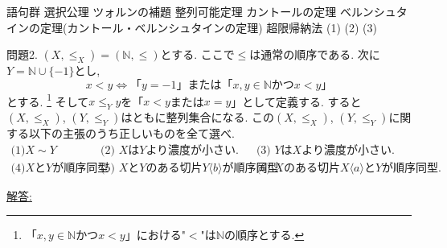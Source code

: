 \documentclass[dvipdfmx,a4paper,11pt]{article}
\newcommand{\N}{\mathbb{N}}
\theoremstyle{definition}
\begin{document}
 \begin{itembox}[l]{語句群}
選択公理 \quad ツォルンの補題 \quad 整列可能定理 \quad カントールの定理 \quad ベルンシュタインの定理(カントール・ベルンシュタインの定理)  \quad 超限帰納法 \quad (1)
\quad (2) \quad (3)
\end{itembox}
\newpage


 問題2. $(X, \le_X)=(\N, \le)$とする. ここで$\le$は通常の順序である. 
 次に$Y=\N \cup \{ -1\}$とし, 
 $$
x < y
 \Longleftrightarrow
 \text{「$y=-1$」} \text{または}
  \text{「$x,y \in \N$かつ$x<y$」} 
 $$
 とする. \footnote{「$x,y \in \N$かつ$x<y$」における"$<$"は$\N$の順序とする.}
 そして$x \le_Y y$を「$x<y$または$x=y$」として定義する.
 すると%
$(X, \le_X)$, $(Y, \le_Y)$はともに整列集合になる. 
この$(X, \le_X)$, $(Y, \le_Y)$に関する以下の主張のうち正しいものを全て選べ.
$$
\begin{array}{lll}
\text{(1)$X \sim Y$}
&
\text{(2) $X$は$Y$より濃度が小さい.}
&
\text{(3) $Y$は$X$より濃度が小さい.}
\\
\text{(4)$X$と$Y$が順序同型}
&
\text{(5) $X$と$Y$のある切片$Y\langle b\rangle$が順序同型.}
&
\text{(6) $X$のある切片$X\langle a\rangle$と$Y$が順序同型.}
\end{array}
$$
 
{ \large \underline{解答: \hspace{6cm}} }
\end{document}
